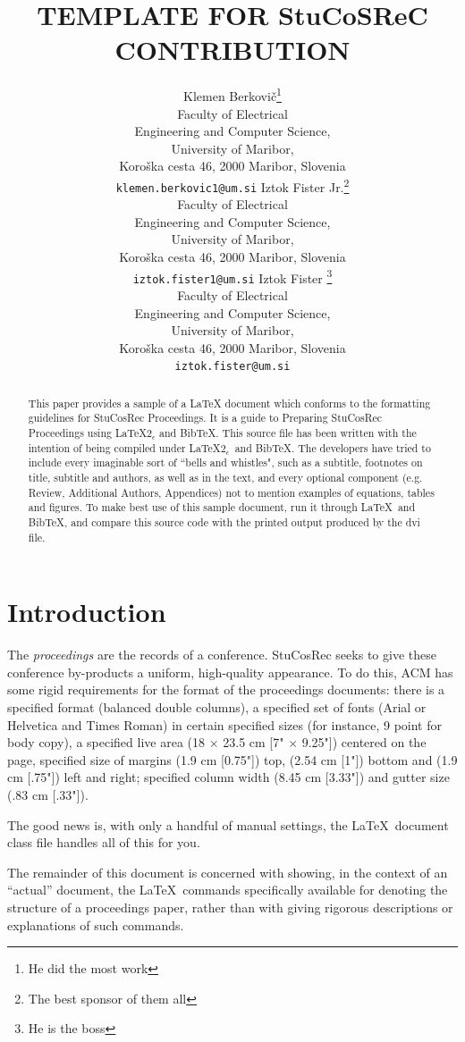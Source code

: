 \documentclass[article]{stucosrec}
\title{\latex TEMPLATE FOR StuCoSReC CONTRIBUTION}
\author{
	Klemen Berkovi\v{c}\thanks{He did the most work} \\
	Faculty of Electrical \\Engineering and Computer Science,\\
	University of Maribor,\\
	Koro\v{s}ka cesta 46, 2000 Maribor, Slovenia \\
	\texttt{klemen.berkovic1@um.si}
	\And
	Iztok Fister Jr.\thanks{The best sponsor of them all} \\
	Faculty of Electrical \\Engineering and Computer Science,\\
	University of Maribor,\\
	Koro\v{s}ka cesta 46, 2000 Maribor, Slovenia \\
	\texttt{iztok.fister1@um.si}
	\AND
	Iztok Fister \thanks{He is the boss} \\
	Faculty of Electrical \\Engineering and Computer Science,\\
	University of Maribor,\\
	Koro\v{s}ka cesta 46, 2000 Maribor, Slovenia \\
	\texttt{iztok.fister@um.si}
}
\newcommand{\latex}{\LaTeX\xspace}
\begin{document}
	
	\maketitle
	
	\begin{abstract}
		This paper provides a sample of a \latex document which conforms to the formatting guidelines for StuCosRec Proceedings.
		It is a guide to Preparing StuCosRec Proceedings using \LaTeX$2_\epsilon$ and Bib\TeX.
		This source file has been written with the intention of being compiled under \LaTeX$2_\epsilon$\ and BibTeX.
		The developers have tried to include every imaginable sort of ``bells and whistles", such as a subtitle, footnotes on title, subtitle and authors, as well as in the text, and every optional component (e.g. Review, Additional Authors, Appendices) not to mention examples of equations, tables and figures.
		To make best use of this sample document, run it through \LaTeX\ and Bib\TeX, and compare this source code with the printed output produced by the dvi file.
	\end{abstract}

		
	\section{Introduction}
	
	The \textit{proceedings} are the records of a conference.
	StuCosRec seeks to give these conference by-products a uniform, high-quality appearance.
	To do this, ACM has some rigid requirements for the format of the proceedings documents: there is a specified format (balanced  double columns), a specified set of fonts (Arial or Helvetica and Times Roman) in certain specified sizes (for instance, 9 point for body copy), a specified live area (18 $\times$ 23.5 cm [7" $\times$ 9.25"]) centered on the page, specified size of margins (1.9 cm [0.75"]) top, (2.54 cm [1"]) bottom and (1.9 cm [.75"]) left and right; specified column width (8.45 cm [3.33"]) and gutter size (.83 cm [.33"]).
	
	The good news is, with only a handful of manual settings, the \LaTeX\ document class file handles all of this for you.
	
	The remainder of this document is concerned with showing, in the context of an ``actual'' document, the \LaTeX\ commands specifically available for denoting the structure of a proceedings paper, rather than with giving rigorous descriptions or explanations of such commands.
	
\end{document}
